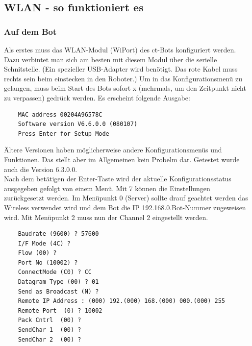 \subsection{WLAN - so funktioniert es}
\label{wlan}

\subsubsection{Auf dem Bot}
\label{wlan_auf_bot}
Als erstes muss das WLAN-Modul (WiPort) des ct-Bots konfiguriert werden.
Dazu verbintet man sich am besten mit diesem Modul über die serielle Schnitstelle.
(Ein spezieller USB-Adapter wird benötigt. Das rote Kabel muss rechts sein beim 
einstecken in den Roboter.) Um in das Konfigurationsmenü zu gelangen,
muss beim Start des Bots sofort x (mehrmals, um den Zeitpunkt nicht zu verpassen)
gedrück werden. Es erscheint folgende Ausgabe:
\begin{verbatim}
    MAC address 00204A96578C
    Software version V6.6.0.0 (080107) 
    Press Enter for Setup Mode
\end{verbatim}
Ältere Versionen haben möglicherweise andere Konfigurationsmenüs und Funktionen.
Das stellt aber im Allgemeinen kein Probelm dar. Getestet wurde auch die Version
6.3.0.0.\\

Nach dem betätigen der Enter-Taste wird der aktuelle
Konfigurationsstatus ausgegeben gefolgt von einem Menü.
Mit 7 können die Einstellungen zurückgesetzt werden.
Im Menüpunkt 0 (Server) sollte drauf geachtet werden das Wireless verwendet wird
und dem Bot die IP 192.168.0.Bot-Nummer zugeweisen wird.
Mit Menüpunkt 2 muss nun der Channel 2 eingestellt werden.
\begin{verbatim}
    Baudrate (9600) ? 57600
    I/F Mode (4C) ? 
    Flow (00) ? 
    Port No (10002) ? 
    ConnectMode (C0) ? CC
    Datagram Type (00) ? 01
    Send as Broadcast (N) ? 
    Remote IP Address : (000) 192.(000) 168.(000) 000.(000) 255
    Remote Port  (0) ? 10002
    Pack Cntrl  (00) ? 
    SendChar 1  (00) ? 
    SendChar 2  (00) ? 
\end{verbatim}


